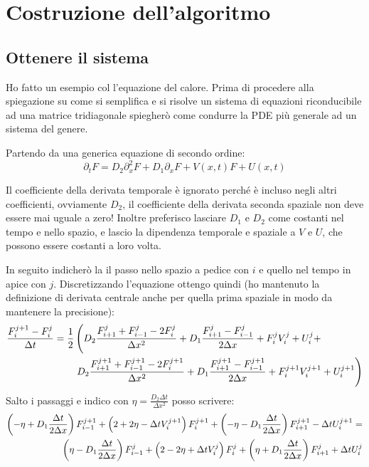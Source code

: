 \section{Costruzione dell'algoritmo}
\subsection{Ottenere il sistema}
Ho fatto un esempio col l'equazione del calore. Prima di procedere alla spiegazione su come si semplifica e si risolve un sistema di equazioni riconducibile ad una matrice tridiagonale spiegher\`o come condurre la PDE pi\`u generale ad un sistema del genere.

Partendo da una generica equazione di secondo ordine:
\begin{equation}\label{eq:generica}
\partial_t F = D_2 \partial^2_x F + D_1 \partial_x F + V(x,t) F + U(x,t)
\end{equation}

Il coefficiente della derivata temporale \`e ignorato perch\'e \`e incluso negli altri coefficienti, ovviamente $D_2$, il coefficiente della derivata seconda spaziale non deve essere mai uguale a zero!
Inoltre preferisco lasciare $D_1$ e $D_2$ come costanti nel tempo e nello spazio, e lascio la dipendenza temporale e spaziale a $V$ e $U$, che possono essere costanti a loro volta.

In seguito indicher\`o la il passo nello spazio a pedice con $i$ e quello nel tempo in apice con $j$.
Discretizzando l'equazione ottengo quindi (ho mantenuto la definizione di derivata centrale anche per quella prima spaziale in modo da mantenere la precisione):
\begin{equation}
\begin{aligned}
\frac{F_i^{j+1} - F_i^j}{\Delta t} = \frac 12&\lr(.{D_2\frac{F^j_{i+1}+F^{j}_{i-1}-2F_i^{j}}{\Delta x^2} + D_1\frac{F^j_{i+1}-F^{j}_{i-1}}{2\Delta x} + F_i^j V_i^j + U_i^j+}\\
&\lr.){D_2\frac{F^{j+1}_{i+1}+F^{j+1}_{i-1}-2F_i^{j+1}}{\Delta x^2} + D_1\frac{F^{j+1}_{i+1}-F^{j+1}_{i-1}}{2\Delta x} + F_i^{j+1} V_i^{j+1} + U_i^{j+1}}
\end{aligned}
\end{equation}
Salto i passaggi e indico con $\eta = \frac {D_2 \Delta t}{\Delta x^2}$ posso scrivere:
\begin{equation}
\begin{aligned}
\lrt{-\eta+D_1\frac{\Delta t}{2\Delta x}}F_{i-1}^{j+1} + \lrt{2 + 2\eta- \Delta t V_i^{j+1}} F^{j+1}_i + \lrt{-\eta-D_1\frac{\Delta t}{2\Delta x}}F_{i+1}^{j+1} - \Delta t U_i^{j+1} = \\
\lrt{\eta-D_1\frac{\Delta t}{2\Delta x}}F_{i-1}^{j} + \lrt{2-2\eta+\Delta t V_i^{j}} F^{j}_i + \lrt{\eta +D_1\frac{\Delta t}{2\Delta x}}F_{i+1}^{j} + \Delta t U_i^{j}
\end{aligned}
\end{equation}

